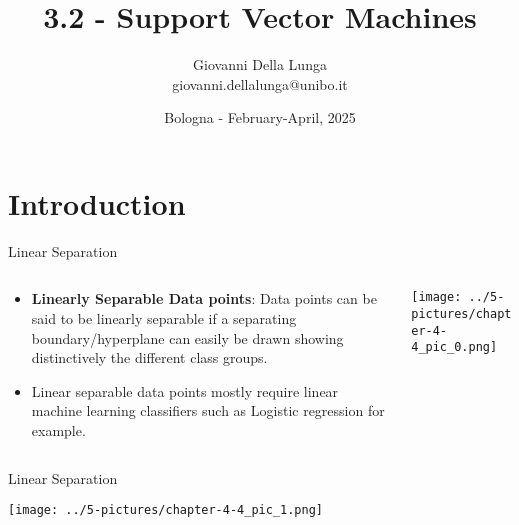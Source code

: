 \documentclass[11pt]{beamer}
\author{Giovanni Della Lunga\\{\footnotesize giovanni.dellalunga@unibo.it}}
\title{3.2 - Support Vector Machines}
\subtitle{} %
\date{Bologna - February-April, 2025}
\begin{document}
\begin{frame}
\titlepage
\end{frame}

\AtBeginSubsection{\frame{\subsectionpage}}





\section{Introduction}
\begin{frame}{Linear Separation}
\begin{columns}[T] %
\begin{column}{.48\textwidth}
        \begin{itemize}
		\item \textbf{Linearly Separable Data points}: Data points can be said to be linearly separable if a separating boundary/hyperplane can easily be drawn showing distinctively the different class groups. 
		\item Linear separable data points mostly require linear machine learning classifiers such as Logistic regression for example.
        \end{itemize}
\end{column}%
\hfill%
\begin{column}{.48\textwidth}
        \texttt{[image: ../5-pictures/chapter-4-4\_pic\_0.png]}
\end{column}%
\end{columns}
\end{frame}
\begin{frame}{Linear Separation}
	\begin{center}
	\texttt{[image: ../5-pictures/chapter-4-4\_pic\_1.png]}
	\end{center}
\end{frame}
\end{document}

